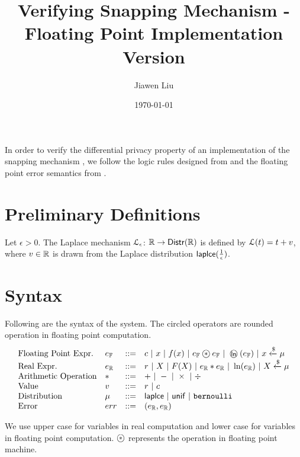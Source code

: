 \documentclass[a4paper,11pt]{article}
\begin{document}
\title{Verifying Snapping Mechanism - Floating Point Implementation Version}
\author{Jiawen Liu}

\date{\today}

\maketitle
In order to verify the differential privacy property of an implementation of the snapping mechanism \cite{mironov2012significance}, we follow the logic rules designed from \cite{barthe2016proving} and the floating point error semantics from \cite{Ramananandro2016unified,Martel2006higher,Becker2018verified,Moscato2017Automatic}.

\section{Preliminary Definitions}
\begin{defn}
Let $\epsilon > 0$. The Laplace mechanism  $\mathcal{L}_{\epsilon}$: $\mathbb{R} \to \mathsf{Distr}(\mathbb{R})$ is defined by $\mathcal{L}(t) = t + v$, where $v \in \mathbb{R}$ is drawn from the Laplace distribution $\mathsf{laplce}(\frac{1}{\epsilon})$.
\end{defn}
%
%
%
\section{Syntax}
Following are the syntax of the system. The circled operators are rounded operation in floating point computation.
\[\begin{array}{llll}
\mbox{Floating Point Expr.} & \fexpr & ::= & \fval
	~|~ \fvarx ~|~ f(\fvarx) ~|~ \fexpr \oop \fexpr
	~|~ \oln (\fexpr) ~|~ \fvarx \samplel \edistr \\
%
\mbox{Real Expr.} & \rexpr & ::= & \rval
	~|~ \rvarx ~|~ F(\rvarx) ~|~ \rexpr * \rexpr
	~|~ \ln (\rexpr) ~|~ \rvarx \samplel \edistr \\
%
\mbox{Arithmetic Operation} & * & ::= & + ~|~ - ~|~ \times ~|~ \div \\
%
\mbox{Value} & \valv & ::= & \rval ~|~  \fval \\
%
\mbox{Distribution} & \edistr & ::= & \laplace ~|~ \uniform ~|~ \bernoulli \\ 
%
\mbox{Error} & \err & ::= & (\rexpr, \rexpr) \\

\end{array}\]

We use upper case for variables in real computation and lower case for variables in floating point computation. $\oop$ represents the operation in floating point machine.
\end{document}
